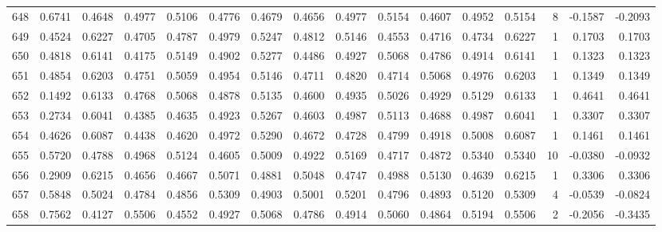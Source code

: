 \begin{tabular}{lrrrrrrrrrrrrrrr}
648 &      0.6741 &  0.4648 &  0.4977 &  0.5106 &  0.4776 &  0.4679 &  0.4656 &  0.4977 &  0.5154 &  0.4607 &   0.4952 &     0.5154 &      8 &                   -0.1587 &                    -0.2093 \\
649 &      0.4524 &  0.6227 &  0.4705 &  0.4787 &  0.4979 &  0.5247 &  0.4812 &  0.5146 &  0.4553 &  0.4716 &   0.4734 &     0.6227 &      1 &                    0.1703 &                     0.1703 \\
650 &      0.4818 &  0.6141 &  0.4175 &  0.5149 &  0.4902 &  0.5277 &  0.4486 &  0.4927 &  0.5068 &  0.4786 &   0.4914 &     0.6141 &      1 &                    0.1323 &                     0.1323 \\
651 &      0.4854 &  0.6203 &  0.4751 &  0.5059 &  0.4954 &  0.5146 &  0.4711 &  0.4820 &  0.4714 &  0.5068 &   0.4976 &     0.6203 &      1 &                    0.1349 &                     0.1349 \\
652 &      0.1492 &  0.6133 &  0.4768 &  0.5068 &  0.4878 &  0.5135 &  0.4600 &  0.4935 &  0.5026 &  0.4929 &   0.5129 &     0.6133 &      1 &                    0.4641 &                     0.4641 \\
653 &      0.2734 &  0.6041 &  0.4385 &  0.4635 &  0.4923 &  0.5267 &  0.4603 &  0.4987 &  0.5113 &  0.4688 &   0.4987 &     0.6041 &      1 &                    0.3307 &                     0.3307 \\
654 &      0.4626 &  0.6087 &  0.4438 &  0.4620 &  0.4972 &  0.5290 &  0.4672 &  0.4728 &  0.4799 &  0.4918 &   0.5008 &     0.6087 &      1 &                    0.1461 &                     0.1461 \\
655 &      0.5720 &  0.4788 &  0.4968 &  0.5124 &  0.4605 &  0.5009 &  0.4922 &  0.5169 &  0.4717 &  0.4872 &   0.5340 &     0.5340 &     10 &                   -0.0380 &                    -0.0932 \\
656 &      0.2909 &  0.6215 &  0.4656 &  0.4667 &  0.5071 &  0.4881 &  0.5048 &  0.4747 &  0.4988 &  0.5130 &   0.4639 &     0.6215 &      1 &                    0.3306 &                     0.3306 \\
657 &      0.5848 &  0.5024 &  0.4784 &  0.4856 &  0.5309 &  0.4903 &  0.5001 &  0.5201 &  0.4796 &  0.4893 &   0.5120 &     0.5309 &      4 &                   -0.0539 &                    -0.0824 \\
658 &      0.7562 &  0.4127 &  0.5506 &  0.4552 &  0.4927 &  0.5068 &  0.4786 &  0.4914 &  0.5060 &  0.4864 &   0.5194 &     0.5506 &      2 &                   -0.2056 &                    -0.3435 \\

\end{tabular}
